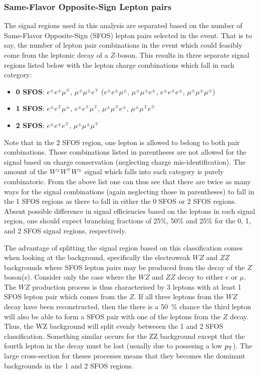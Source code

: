 \subsubsection{Same-Flavor Opposite-Sign Lepton pairs}
\label{sec:sfos}
The signal regions used in this analysis are separated based on the number of 
Same-Flavor Opposite-Sign (SFOS) lepton pairs selected in the event.  That is to say,
the number of lepton pair combinations in the event 
which could feasibly come from the leptonic decay of a $Z$-boson.
This results in three separate signal regions listed below with the lepton charge combinations
which fall in each category:
\begin{itemize}
\item \textbf{0 SFOS}: $e^{\pm}e^{\pm}\mu^{\mp}$, $\mu^{\pm}\mu^{\pm}e^{\mp}$ ($e^{\pm}e^{\pm}\mu^{\pm}$, $\mu^{\pm}\mu^{\pm}e^{\pm}$, $e^{\pm}e^{\pm}e^{\pm}$, $\mu^{\pm}\mu^{\pm}\mu^{\pm}$)
\item \textbf{1 SFOS}: $e^{\pm}e^{\mp}\mu^{\pm}$, $e^{\pm}e^{\mp}\mu^{\mp}$, $\mu^{\pm}\mu^{\mp}e^{\pm}$, $\mu^{\pm}\mu^{\mp}e^{\mp}$
\item \textbf{2 SFOS}: $e^{\pm}e^{\pm}e^{\mp}$, $\mu^{\pm}\mu^{\pm}\mu^{\mp}$
\end{itemize}
Note that in the 2 SFOS region, one lepton is allowed to belong to both pair combinations.
Those combinations listed in parentheses are not allowed for the signal based on charge conservation (neglecting charge mis-identification).  
The amount of the $W^{\pm}W^{\mp}W^{\pm}$ signal
which falls into each category is purely combinatoric.  
From the above list one can thus see that there are twice as many ways for the signal combinations (again neglecting those in parentheses)
to fall in the 1 SFOS regions as there to fall in either the 0 SFOS or 2 SFOS regions. 
Absent possible difference in signal efficiencies based on the leptons in each 
signal region, one should expect branching fractions of 25\%, 50\% and 25\% for the 0, 1, and 2 SFOS signal regions, respectively.

The advantage of splitting the signal region based on this
classification comes when looking at the background, specifically the
electroweak $WZ$ and $ZZ$ backgrounds where SFOS lepton pairs may be
produced from the decay of the $Z$ boson(s). Consider only the case
where the $WZ$ and $ZZ$ decay to either $e$ or $\mu$.  The $WZ$ production
process is thus characterised by 3 leptons with at least 1 SFOS lepton pair
which comes from the $Z$. If all three leptons from the $WZ$ decay have been
reconstructed, then the there is a 50~\% chance the third lepton 
will also be able to form a SFOS pair with one of the leptons from the $Z$ decay.
Thus, the WZ background will split evenly betweeen the 1 and 2 SFOS classification.
Something similar occurs for the ZZ background except that the fourth lepton 
in the decay must be lost (usually due to possesing a low $p_{\mathrm{T}}$).
The large cross-section for theses processes means that
they becomes the dominant backgrounds in the 1 and 2 SFOS regions.  

